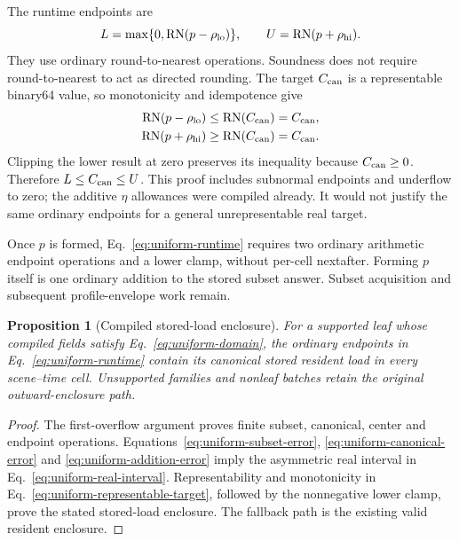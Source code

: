\documentclass[11pt]{article}
\newtheorem{proposition}{Proposition}
\begin{document}
The runtime endpoints are
\begin{equation}
L=\max\{0,\operatorname{RN}(p-\rho_{\rm lo})\},
\qquad U=\operatorname{RN}(p+\rho_{\rm hi}).
\label{eq:uniform-runtime}
\end{equation}
They use ordinary round-to-nearest operations. Soundness does not require round-to-nearest to act as directed rounding. The target $C_{\rm can}$ is a representable binary64 value, so monotonicity and idempotence give
\begin{align}
\operatorname{RN}(p-\rho_{\rm lo})
 &\le\operatorname{RN}(C_{\rm can})=C_{\rm can},\\
\operatorname{RN}(p+\rho_{\rm hi})
 &\ge\operatorname{RN}(C_{\rm can})=C_{\rm can}.
\label{eq:uniform-representable-target}
\end{align}
Clipping the lower result at zero preserves its inequality because $C_{\rm can}\ge0$. Therefore $L\le C_{\rm can}\le U$. This proof includes subnormal endpoints and underflow to zero; the additive $\eta$ allowances were compiled already. It would not justify the same ordinary endpoints for a general unrepresentable real target.

Once $p$ is formed, Eq.~\eqref{eq:uniform-runtime} requires two ordinary arithmetic endpoint operations and a lower clamp, without per-cell nextafter. Forming $p$ itself is one ordinary addition to the stored subset answer. Subset acquisition and subsequent profile-envelope work remain.

\begin{proposition}[Compiled stored-load enclosure]\label{prop:uniform-load-enclosure}
For a supported leaf whose compiled fields satisfy Eq.~\eqref{eq:uniform-domain}, the ordinary endpoints in Eq.~\eqref{eq:uniform-runtime} contain its canonical stored resident load in every scene--time cell. Unsupported families and nonleaf batches retain the original outward-enclosure path.
\end{proposition}
\begin{proof}
The first-overflow argument proves finite subset, canonical, center and endpoint operations. Equations~\eqref{eq:uniform-subset-error}, \eqref{eq:uniform-canonical-error} and \eqref{eq:uniform-addition-error} imply the asymmetric real interval in Eq.~\eqref{eq:uniform-real-interval}. Representability and monotonicity in Eq.~\eqref{eq:uniform-representable-target}, followed by the nonnegative lower clamp, prove the stated stored-load enclosure. The fallback path is the existing valid resident enclosure.
\end{proof}
\end{document}
